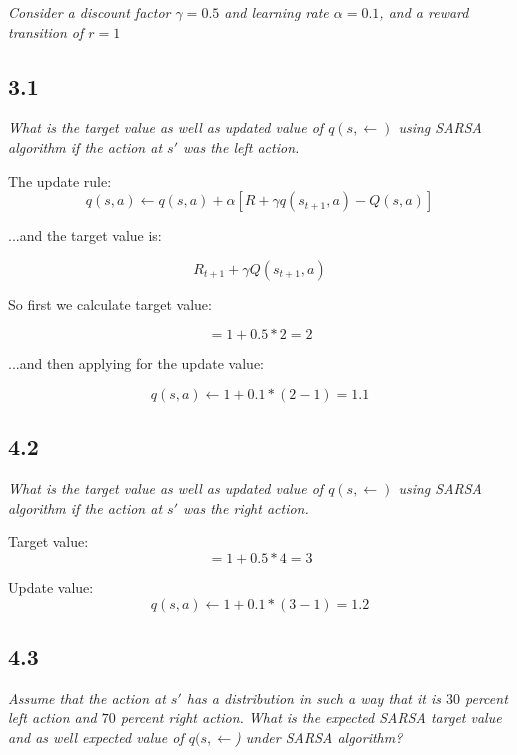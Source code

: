 \documentclass{article}
\begin{document}
\textit{Consider a discount factor $\gamma = 0.5$ and learning rate $\alpha=0.1$, and a reward transition of $r=1$}

\subsection*{3.1}
\textit{What is the target value as well as updated value of $q(s,\leftarrow)$ using SARSA algorithm if the action at $s'$ was the left action.}

The update rule:
\begin{equation}
    q(s,a) \leftarrow q(s,a) + \alpha [R + \gamma q(s_{t+1},a) - Q(s,a)]
\end{equation}

...and the target value is:

\begin{equation}
    R_{t+1} + \gamma Q(s_{t+1}, a)
\end{equation}

So first we calculate target value:

\begin{equation}
    = 1 + 0.5 * 2 = 2
\end{equation}

...and then applying for the update value:

\begin{equation}
    q(s,a) \leftarrow 1 + 0.1 * (2 - 1) = 1.1
\end{equation}

\subsection*{4.2}

\textit{ What is the target value as well as updated value of $q(s, \leftarrow)$ using SARSA algorithm if the action at $s'$ was the right action.}

Target value:
\begin{equation}
    = 1 + 0.5 * 4 = 3
\end{equation}

Update value:
\begin{equation}
    q(s,a) \leftarrow 1 + 0.1 * (3 - 1) = 1.2
\end{equation}

\subsection*{4.3}

\textit{Assume that the action at $s'$ has a distribution in such a way that it is $30$ percent left action and $70$ percent right action. What is the expected SARSA target value and as well expected value of $q(s,\leftarrow$) under SARSA algorithm?}
\end{document}
